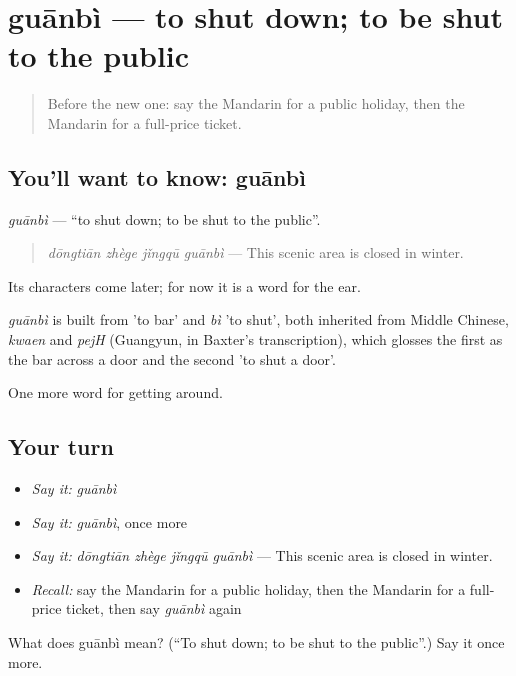 \section[guānbì]{guānbì — to shut down; to be shut to the public}

\label{lesson:ZH-C432-guanbi}



\begin{quote}
Before the new one: say the Mandarin for a public holiday, then the Mandarin for a full-price ticket.
\end{quote}

\subsection*{You'll want to know: guānbì}
\emph{guānbì} — \textquotedblleft{}to shut down; to be shut to the public\textquotedblright{}.

\begin{quote}
\emph{dōngtiān zhège jǐngqū guānbì} — This scenic area is closed in winter.
\end{quote}

Its characters come later; for now it is a word for the ear.

\begin{cousinweb}
\emph{guānbì} is built from  'to bar' and \emph{bì} 'to shut', both inherited from Middle Chinese, \emph{kwaen} and \emph{pejH} (Guangyun, in Baxter's transcription), which glosses the first as the bar across a door and the second 'to shut a door'.
\end{cousinweb}

\begin{grammarlens}[title={What you've built}]
One more word for getting around.
\end{grammarlens}

\subsection*{Your turn}
\begin{itemize}
\raggedright
  \item \emph{Say it:} \emph{guānbì}
  \item \emph{Say it:} \emph{guānbì}, once more
  \item \emph{Say it:} \emph{dōngtiān zhège jǐngqū guānbì} — This scenic area is closed in winter.
  \item \emph{Recall:} say the Mandarin for a public holiday, then the Mandarin for a full-price ticket, then say \emph{guānbì} again
\end{itemize}

\begin{tcolorbox}[breakable,colback=teal!4,colframe=teal!35!black,title={Before you move on}]
What does guānbì mean? (\textquotedblleft{}To shut down; to be shut to the public\textquotedblright{}.) Say it once more.
\end{tcolorbox}
